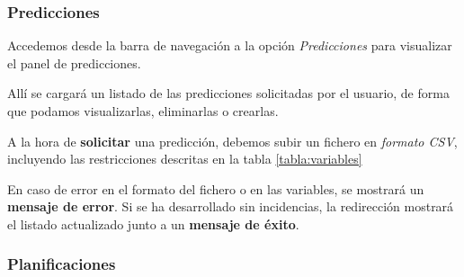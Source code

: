 \subsubsection{Predicciones}

Accedemos desde la barra de navegación a la opción \textit{Predicciones} para visualizar el panel de predicciones.

Allí se cargará un listado de las predicciones solicitadas por el usuario, de forma que podamos visualizarlas, eliminarlas o crearlas.


A la hora de \textbf{solicitar} una predicción, debemos subir un fichero en \textit{formato CSV}, incluyendo las restricciones descritas en la tabla \ref{tabla:variables}


En caso de error en el formato del fichero o en las variables, se mostrará un \textbf{mensaje de error}. Si se ha desarrollado sin incidencias, la redirección mostrará el listado actualizado junto a un \textbf{mensaje de éxito}.



\subsubsection{Planificaciones}

